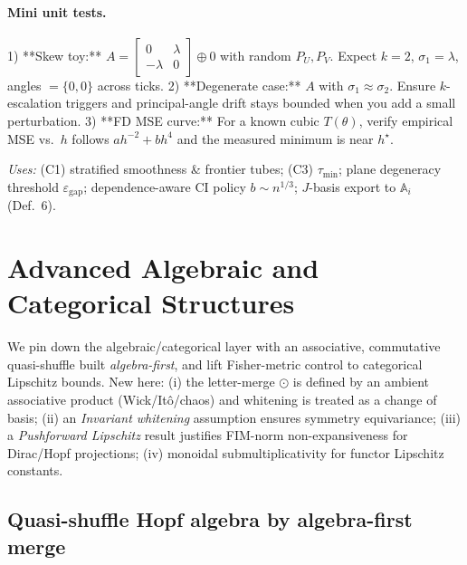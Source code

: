 \documentclass[10pt]{article}
\begin{document}
\paragraph{Mini unit tests.}
1) **Skew toy:** \(A=\begin{bmatrix}0&\lambda\\-\lambda&0\end{bmatrix}\oplus 0\) with random \(P_U,P_V\). Expect \(k\!=\!2\), \(\sigma_1=\lambda\), angles \(=\{0,0\}\) across ticks.  
2) **Degenerate case:** \(A\) with \(\sigma_1\approx\sigma_2\). Ensure \(k\)-escalation triggers and principal-angle drift stays bounded when you add a small perturbation.  
3) **FD MSE curve:** For a known cubic \(T(\theta)\), verify empirical MSE vs.\ \(h\) follows \(a h^{-2} + b h^4\) and the measured minimum is near \(h^\star\).  

\emph{Uses: } (C1) stratified smoothness \& frontier tubes; (C3) \(\tau_{\min}\); plane degeneracy threshold \(\varepsilon_{\mathrm{gap}}\); dependence-aware CI policy \(b\sim n^{1/3}\); \(J\)-basis export to \(\mathbb A_i\) (Def.\ 6).


\section{Advanced Algebraic and Categorical Structures}\label{sec:adv-structures}

We pin down the algebraic/categorical layer with an associative, commutative quasi-shuffle built \emph{algebra-first}, and lift Fisher-metric control to categorical Lipschitz bounds. New here:
(i) the letter-merge $\odot$ is defined by an ambient associative product (Wick/Itô/chaos) and whitening is treated as a change of basis; 
(ii) an \emph{Invariant whitening} assumption ensures symmetry equivariance; 
(iii) a \emph{Pushforward Lipschitz} result justifies FIM-norm non-expansiveness for Dirac/Hopf projections; 
(iv) monoidal submultiplicativity for functor Lipschitz constants.

\setcounter{lemma}{11}
\setcounter{theorem}{3}

\subsection{Quasi-shuffle Hopf algebra by algebra-first merge}\label{sec:hopf}
\end{document}
